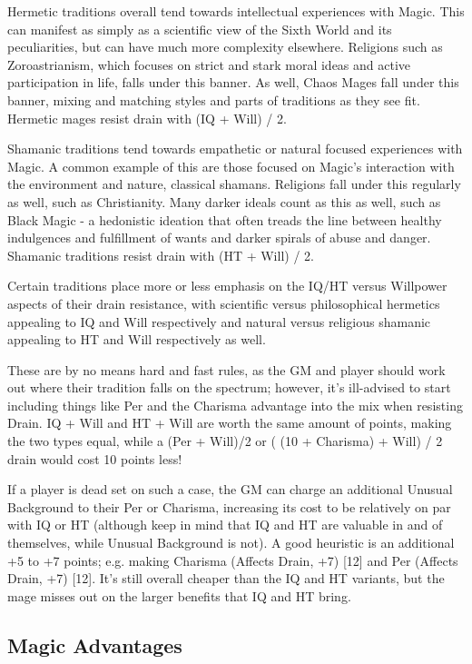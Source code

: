 \begin{multicols}{3}
	Hermetic traditions overall tend towards intellectual experiences with Magic. This can manifest as simply as a scientific view of the Sixth World and its peculiarities, but can have much more complexity elsewhere. Religions such as Zoroastrianism, which focuses on strict and stark moral ideas and active participation in life, falls under this banner. As well, Chaos Mages fall under this banner, mixing and matching styles and parts of traditions as they see fit. Hermetic mages resist drain with (IQ + Will) / 2.
	
	Shamanic traditions tend towards empathetic or natural focused experiences with Magic. A common example of this are those focused on Magic's interaction with the environment and nature, classical shamans. Religions fall under this regularly as well, such as Christianity. Many darker ideals count as this as well, such as Black Magic - a hedonistic ideation that often treads the line between healthy indulgences and fulfillment of wants and darker spirals of abuse and danger. Shamanic traditions resist drain with (HT + Will) / 2.
	
	Certain traditions place more or less emphasis on the IQ/HT versus Willpower aspects of their drain resistance, with scientific versus philosophical hermetics appealing to IQ and Will respectively and natural versus religious shamanic appealing to HT and Will respectively as well.
	
	These are by no means hard and fast rules, as the GM and player should work out where their tradition falls on the spectrum; however, it's ill-advised to start including things like Per and the Charisma advantage into the mix when resisting Drain. IQ + Will and HT + Will are worth the same amount of points, making the two types equal, while a (Per + Will)/2 or ( (10 + Charisma) + Will) / 2 drain would cost 10 points less! 
	
	If a player is dead set on such a case, the GM can charge an additional Unusual Background to their Per or Charisma, increasing its cost to be relatively on par with IQ or HT (although keep in mind that IQ and HT are valuable in and of themselves, while Unusual Background is not). A good heuristic is an additional +5 to +7 points; e.g. making Charisma (Affects Drain, +7) [12] and Per (Affects Drain, +7) [12]. It's still overall cheaper than the IQ and HT variants, but the mage misses out on the larger benefits that IQ and HT bring.
	
	\subsection{Magic Advantages}
	

\end{multicols}
